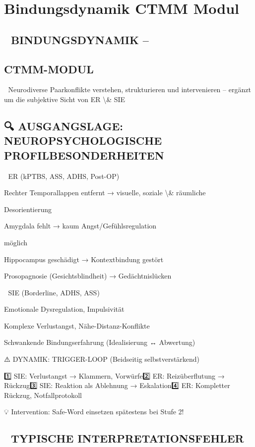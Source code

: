 \section{Bindungsdynamik CTMM Modul}

\subsection{🧾 BINDUNGSDYNAMIK --}

\subsection{CTMM-MODUL}

🧩 Neurodiverse Paarkonflikte verstehen, strukturieren und intervenieren -- ergänzt um die subjektive Sicht von ER \textbackslash{}& SIE

\subsection{🔍 AUSGANGSLAGE: NEUROPSYCHOLOGISCHE PROFILBESONDERHEITEN}

🔵 ER (kPTBS, ASS, ADHS, Post-OP)

Rechter Temporallappen entfernt → visuelle, soziale \textbackslash{}& räumliche

Desorientierung

Amygdala fehlt   → kaum Angst/Gefühlsregulation

möglich

Hippocampus geschädigt   → Kontextbindung gestört

Prosopagnosie (Gesichtsblindheit) → Gedächtnislücken

🔴 SIE (Borderline, ADHS, ASS)

Emotionale Dysregulation, Impulsivität

Komplexe Verlustangst, Nähe-Distanz-Konflikte

Schwankende Bindungserfahrung (Idealisierung ↔ Abwertung)

⚠️ DYNAMIK: TRIGGER-LOOP (Beidseitig selbstverstärkend)

1️⃣ SIE: Verlustangst → Klammern, Vorwürfe2️⃣ ER: Reizüberflutung → Rückzug3️⃣ SIE: Reaktion als Ablehnung → Eskalation4️⃣ ER: Kompletter Rückzug, Notfallprotokoll

💡 Intervention: Safe-Word einsetzen spätestens bei Stufe 2!

\subsection{🧠 TYPISCHE INTERPRETATIONSFEHLER}

